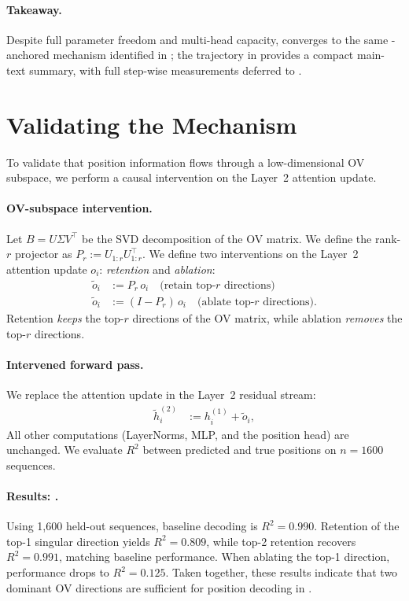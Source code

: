 \documentclass{article}
\theoremstyle{plain}
\theoremstyle{definition}
\theoremstyle{remark}
\begin{document}
\paragraph{Takeaway.}
Despite full parameter freedom and multi-head capacity, \modelfull converges to the same \bos-anchored mechanism
identified in \modelminimal; the trajectory in  provides a compact main-text summary, with full step-wise
measurements deferred to .

\section{Validating the Mechanism}
\label{sec:write_bottleneck}
To validate that position information flows through a low-dimensional OV subspace,
we perform a causal intervention on the Layer~2 attention update.
\paragraph{OV-subspace intervention.}
Let $B = U\Sigma V^\top$ be the SVD decomposition of the OV matrix.
We define the rank-$r$ projector as $P_r := U_{1:r}U_{1:r}^\top$.
We define two interventions on the Layer~2 attention update $o_i$: \textit{retention} and \textit{ablation}:
\begin{align}
\tilde o_i &:= P_r\, o_i \quad \text{(retain top-$r$ directions)} \\
\tilde o_i &:= (I-P_r)\, o_i \quad \text{(ablate top-$r$ directions)}.
\end{align}
Retention \textit{keeps} the top-$r$ directions of the OV matrix, while ablation \textit{removes} the top-$r$ directions.
\paragraph{Intervened forward pass.}
We replace the attention update in the Layer~2 residual stream:
\begin{align}
\tilde h_i^{(2)} &:= h_i^{(1)} + \tilde o_i,
\end{align}
All other computations (LayerNorms, MLP, and the position head) are unchanged.
We evaluate $R^2$ between predicted and true positions on $n=1600$ sequences.


\paragraph{Results: \modelminimal.}
Using 1,600 held-out sequences, baseline decoding is $R^2=0.990$.
Retention of the top-1 singular direction yields $R^2=0.809$,
while top-2 retention recovers $R^2=0.991$, matching baseline performance.
When ablating the top-1 direction, performance drops to $R^2=0.125$.
Taken together, these results indicate that two dominant OV directions are sufficient for position decoding in \modelminimal.
\end{document}
